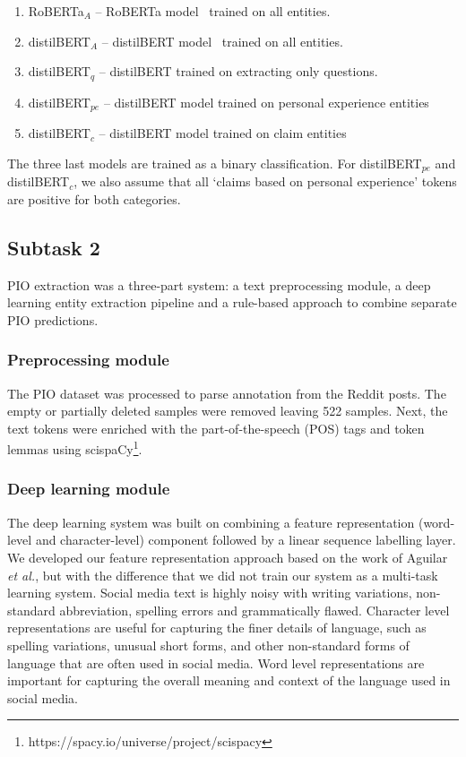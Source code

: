 \documentclass[11pt]{article}
\begin{document}
\begin{enumerate}
\item RoBERTa$_A$ -- RoBERTa model~\cite{Liu2019RoBERTaAR} trained on all entities. %
\item distilBERT$_A$ -- distilBERT model~\cite{Sanh2019DistilBERTAD} trained on all entities.  %
\item  distilBERT$_q$ --  distilBERT trained on extracting only questions. %
\item distilBERT$_{pe}$ -- distilBERT model trained on personal experience entities %
\item distilBERT$_c$ -- distilBERT model trained on claim entities %
\end{enumerate}

The three last models are trained as a binary classification. 
For distilBERT$_{pe}$ and distilBERT$_c$, we also assume that all `claims based on personal experience’ tokens are positive for both categories.


%
%
%
\subsection{Subtask 2}
\label{system:task2}
%
PIO extraction was a three-part system: a text preprocessing module, a deep learning entity extraction pipeline and a rule-based approach to combine separate PIO predictions.
%
%
%
\subsubsection{Preprocessing module}
%
The PIO dataset was processed to parse annotation from the Reddit posts.
The empty or partially deleted samples were removed leaving 522 samples.
Next, the text tokens were enriched with the part-of-the-speech (POS) tags and token lemmas using scispaCy\footnote{https://spacy.io/universe/project/scispacy}.
%
%
%
\subsubsection{Deep learning module}
%
The deep learning system was built on combining a feature representation (word-level and character-level) component followed by a linear sequence labelling layer.
We developed our feature representation approach based on the work of Aguilar \textit{et al.}, but with the difference that we did not train our system as a multi-task learning system.
Social media text is highly noisy with writing variations, non-standard abbreviation, spelling errors and grammatically flawed.
Character level representations are useful for capturing the finer details of language, such as spelling variations, unusual short forms, and other non-standard forms of language that are often used in social media. 
Word level representations are important for capturing the overall meaning and context of the language used in social media. 
%
%
%
\end{document}
